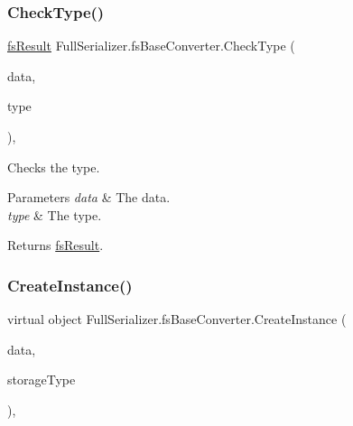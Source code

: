 \subsubsection{\texorpdfstring{Check\+Type()}{CheckType()}}
{\footnotesize\ttfamily \hyperlink{struct_full_serializer_1_1fs_result}{fs\+Result} Full\+Serializer.\+fs\+Base\+Converter.\+Check\+Type (\begin{DoxyParamCaption}\item[{\hyperlink{class_full_serializer_1_1fs_data}{fs\+Data}}]{data,  }\item[{\hyperlink{namespace_full_serializer_a6eee33d63b94e40fdfcfc59af9fcfc82}{fs\+Data\+Type}}]{type }\end{DoxyParamCaption})\hspace{0.3cm}{\ttfamily [inline]}, {\ttfamily [protected]}}



Checks the type. 


\begin{DoxyParams}{Parameters}
{\em data} & The data.\\
\hline
{\em type} & The type.\\
\hline
\end{DoxyParams}
\begin{DoxyReturn}{Returns}
\hyperlink{struct_full_serializer_1_1fs_result}{fs\+Result}.
\end{DoxyReturn}
\mbox{\label{class_full_serializer_1_1fs_base_converter_a415ea2ac9429bbb9927346af7cb7c2e1}} 
\subsubsection{\texorpdfstring{Create\+Instance()}{CreateInstance()}}
{\footnotesize\ttfamily virtual object Full\+Serializer.\+fs\+Base\+Converter.\+Create\+Instance (\begin{DoxyParamCaption}\item[{\hyperlink{class_full_serializer_1_1fs_data}{fs\+Data}}]{data,  }\item[{Type}]{storage\+Type }\end{DoxyParamCaption})\hspace{0.3cm}{\ttfamily [inline]}, {\ttfamily [virtual]}}



